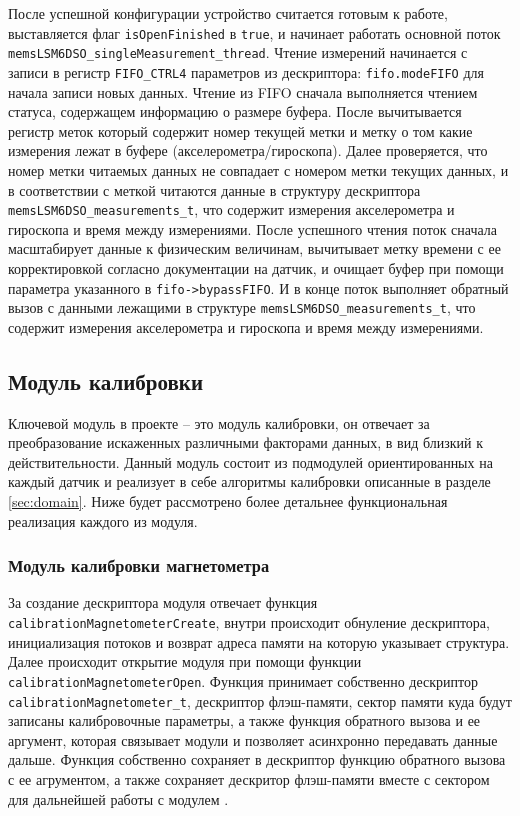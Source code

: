 После успешной конфигурации устройство считается готовым к работе, выставляется флаг \lstinline{isOpenFinished} в \lstinline{true}, и начинает
работать основной поток \lstinline{memsLSM6DSO_singleMeasurement_thread}. Чтение измерений начинается с записи в регистр \lstinline{FIFO_CTRL4}
параметров из дескриптора: \lstinline{fifo.modeFIFO} для начала записи новых данных.
Чтение из FIFO сначала выполняется чтением статуса, содержащем информацию о размере буфера. После вычитывается регистр меток
который содержит номер текущей метки и метку о том какие измерения лежат в буфере (акселерометра/гироскопа). 
Далее проверяется, что номер метки читаемых данных не совпадает с номером метки текущих данных,
и в соответствии с меткой читаются данные в структуру дескриптора \lstinline{memsLSM6DSO_measurements_t}, что содержит измерения акселерометра и гироскопа и время между измерениями.
После успешного чтения поток сначала масштабирует данные к физическим величинам, вычитывает
метку времени с ее корректировкой согласно документации на датчик, и очищает буфер при помощи параметра указанного в \lstinline{fifo->bypassFIFO}.
И в конце поток выполняет обратный вызов с данными лежащими в структуре \lstinline{memsLSM6DSO_measurements_t}, что содержит измерения акселерометра и гироскопа и время между измерениями.

\subsection{Модуль калибровки}

Ключевой модуль в проекте -- это модуль калибровки, он отвечает за преобразование искаженных различными факторами данных, в вид близкий к действительности. 
Данный модуль состоит из подмодулей ориентированных на каждый датчик и реализует в себе алгоритмы калибровки описанные в разделе \ref{sec:domain}.
Ниже будет рассмотрено более детальнее функциональная реализация каждого из модуля.

\subsubsection{Модуль калибровки магнетометра}

За создание дескриптора модуля отвечает функция \lstinline{calibrationMagnetometerCreate}, внутри происходит обнуление дескриптора,
инициализация потоков и возврат адреса памяти на которую указывает структура. Далее происходит открытие модуля при помощи функции 
\lstinline{calibrationMagnetometerOpen}. Функция принимает собственно дескриптор \lstinline{calibrationMagnetometer_t},
дескриптор флэш-памяти, сектор памяти куда будут записаны калибровочные параметры, а также функция обратного вызова и ее аргумент, 
которая связывает модули и позволяет асинхронно передавать данные дальше. Функция собственно сохраняет в дескриптор функцию обратного вызова с ее агрументом,
а также сохраняет дескритор флэш-памяти вместе с сектором для дальнейшей работы с модулем \moduleFlashMemory. 

